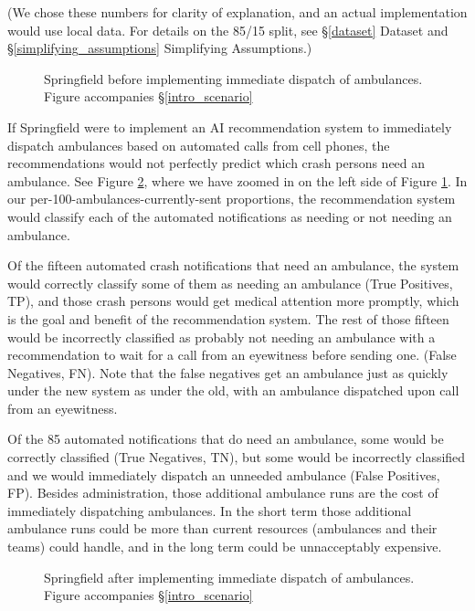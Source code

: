 (We chose these numbers for clarity of explanation, and an actual implementation would use local data.  For details on the 85/15 split, see \S\ref{dataset} Dataset and \S\ref{simplifying_assumptions} Simplifying Assumptions.)

\begin{figure}[h]
	
\caption{\normalfont\normalsize Springfield before implementing immediate dispatch of ambulances.  Figure accompanies \S\ref{intro_scenario}}
\label{intro_springfield_before}
\end{figure}

\FloatBarrier

If Springfield were to implement an AI recommendation system to immediately dispatch ambulances based on automated calls from cell phones, the recommendations would not perfectly predict which crash persons need an ambulance.    See Figure \ref{intro_springfield_after}, where we have zoomed in on the left side of Figure \ref{intro_springfield_before}. In our per-100-ambulances-currently-sent proportions, the recommendation system would classify each of the automated notifications as needing or not needing an ambulance.  

Of the fifteen automated crash notifications that need an ambulance, the system would correctly classify some of them as needing an ambulance (True Positives, TP), and those crash persons would get medical attention more promptly, which is the goal and benefit of the recommendation system.  The rest of those fifteen would be incorrectly classified as probably not needing an ambulance with a recommendation to wait for a call from an eyewitness before sending one. (False Negatives, FN).  Note that the false negatives get an ambulance just as quickly under the new system as under the old,  with an ambulance dispatched upon call from an eyewitness.  

Of the 85 automated notifications that do need an ambulance, some would be correctly classified (True Negatives, TN), but some would be incorrectly classified and we would immediately dispatch an unneeded ambulance (False Positives, FP).  Besides administration, those additional ambulance runs are the cost of immediately dispatching ambulances.  In the short term those additional ambulance runs could be more than current resources (ambulances and their teams) could handle, and in the long term could be unnacceptably expensive.  

\begin{figure}[h]
	
\caption{\normalfont\normalsize Springfield after implementing immediate dispatch of ambulances.  Figure accompanies \S\ref{intro_scenario}}
\label{intro_springfield_after}
\end{figure}

